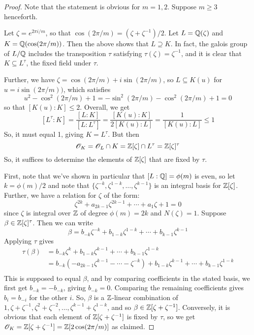 \begin{proof}
	Note that the statement is obvious for $m = 1,2$. Suppose $m \geq 3$ henceforth.
	
	Let $\zeta = e^{2\pi i/m}$, so that $\cos(2\pi/m) = (\zeta+\zeta^{-1})/2$. Let $L = \mathbb{Q}(\zeta)$ and $K = \mathbb{Q}(\cos(2\pi/m))$. Then the above shows that $L \supseteq K$. In fact, the galois group of $L/\mathbb{Q}$ includes the transposition $\tau$ satisfying $\tau(\zeta) = \zeta^{-1}$, and it is clear that $K \subseteq L^\tau$, the fixed field under $\tau$.
	
	Further, we have $\zeta = \cos(2\pi/m)+i\sin(2\pi/m)$, so $L \subseteq K(u)$ for $u = i\sin(2\pi/m))$, which satisfies
	\[ u^2-\cos^2(2\pi/m)+1 = -\sin^2(2\pi/m)-\cos^2(2\pi/m)+1 = 0 \]
	so that $[K(u):K] \leq 2$. Overall, we get
	\[ [L^\tau:K] = \frac{[L:K]}{[L:L^\tau]} = \frac{[K(u):K]}{2[K(u):L]} = \frac{1}{[K(u):L]} \leq 1 \]
	So, it must equal 1, giving $K = L^\tau$. But then
	\[ \mathscr{O}_K = \mathscr{O}_L \cap K = \mathbb{Z}[\zeta] \cap L^\tau = \mathbb{Z}[\zeta]^\tau \]
	So, it suffices to determine the elements of $\mathbb{Z}[\zeta]$ that are fixed by $\tau$.
	
	First, note that we've shown in particular that $[L:\mathbb{Q}] = \phi(m)$ is even, so let $k = \phi(m)/2$ and note that $\{\zeta^{-k},\zeta^{1-k},\ldots,\zeta^{k-1}\}$ is an integral basis for $\mathbb{Z}[\zeta]$. Further, we have a relation for $\zeta$ of the form:
	\[ \zeta^{2k}+a_{2k-1}\zeta^{2k-1}+\cdots+a_1\zeta+1 = 0 \]
	since $\zeta$ is integral over $\mathbb{Z}$ of degree $\phi(m) = 2k$ and $N(\zeta) = 1$. Suppose $\beta \in \mathbb{Z}[\zeta]^\tau$. Then we can write
	\[ \beta = b_{-k}\zeta^{-k} + b_{1-k}\zeta^{1-k} + \cdots + b_{k-1}\zeta^{k-1} \]
	Applying $\tau$ gives
	\begin{align*}
	\tau(\beta)
		&= b_{-k}\zeta^k + b_{1-k}\zeta^{k-1} + \cdots + b_{k-1}\zeta^{1-k} \\
		&= b_{-k}(-a_{2k-1}\zeta^{k-1}-\cdots-\zeta^{-k}) + b_{1-k}\zeta^{k-1} + \cdots + b_{k-1}\zeta^{1-k} \\
	\end{align*}
	This is supposed to equal $\beta$, and by comparing coefficients in the stated basis, we first get $b_{-k} = -b_{-k}$, giving $b_{-k} = 0$. Comparing the remaining coefficients gives $b_i = b_{-i}$ for the other $i$. So, $\beta$ is a $\mathbb{Z}$-linear combination of $1,\zeta+\zeta^{-1},\zeta^2+\zeta^{-2},\ldots,\zeta^{k-1}+\zeta^{1-k}$, and so $\beta \in \mathbb{Z}[\zeta+\zeta^{-1}]$. Conversely, it is obvious that each element of $\mathbb{Z}[\zeta+\zeta^{-1}]$ is fixed by $\tau$, so we get $\mathscr{O}_K = \mathbb{Z}[\zeta+\zeta^{-1}] = \mathbb{Z}[2\cos(2\pi/m)]$ as claimed.
\end{proof}
